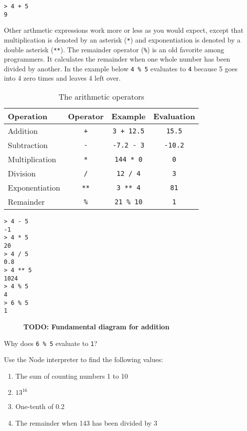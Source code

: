 \suppresslinenumbers
\begin{lstlisting}
> 4 + 5
9
\end{lstlisting}

Other arthmetic expressions work more or less as you would expect, except that multiplication is denoted by an asterisk (\texttt{*}) and exponentiation is denoted by a double asterisk (\texttt{**}). The remainder operator (\texttt{\%}) is an old favorite among programmers. It calculates the remainder when one whole number has been divided by another. In the example below \texttt{4 \% 5} evaluates to \texttt{4} because 5 goes into 4 zero times and leaves 4 left over.

\begin{table}
  \begin{tabular}{lccc}
    Operation & Operator & Example & Evaluation\\
    \hline
    Addition & \texttt{+} & \texttt{3 + 12.5} & \texttt{15.5}\\
    Subtraction & \texttt{-} & \texttt{-7.2 - 3} & \texttt{-10.2}\\
    Multiplication & \texttt{*} & \texttt{144 * 0} & \texttt{0}\\
    Division & \texttt{/} & \texttt{12 / 4} & \texttt{3}\\
    Exponentiation & \texttt{**} & \texttt{3 ** 4} & \texttt{81}\\
    Remainder & \texttt{\%} & \texttt{21 \% 10} & \texttt{1}\\
  \end{tabular}
  \caption{The arithmetic operators}
\end{table}

\begin{lstlisting}
> 4 - 5
-1
> 4 * 5
20
> 4 / 5
0.8
> 4 ** 5
1024
> 4 % 5
4
> 6 % 5
1
\end{lstlisting}

\begin{figure}
  \textbf{TODO: Fundamental diagram for addition}
\end{figure}
\begin{question}
  Why does \texttt{6 \% 5} evaluate to \texttt{1}?
\end{question}

\begin{question}
  Use the Node interpreter to find the following values:
  \begin{enumerate}
    \item The sum of counting numbers 1 to 10
    \item $13^{16}$
    \item One-tenth of 0.2
    \item The remainder when 143 has been divided by 3
  \end{enumerate}
\end{question}

